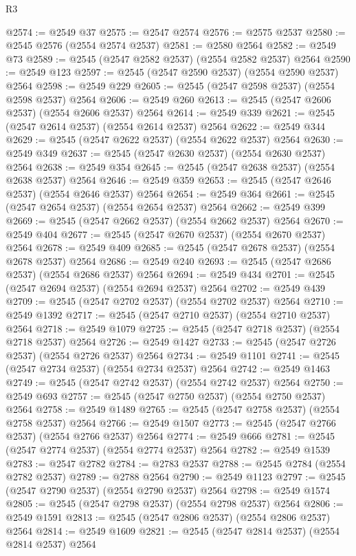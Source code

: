 \begin{lexlean}{R3}
\begin{coremodule}
@2574 := @2549 @37
@2575 := @2547 @2574
@2576 := @2575 @2537
@2580 := @2545 @2576 (@2554 @2574 @2537)
@2581 := @2580 @2564
@2582 := @2549 @73
@2589 := @2545 (@2547 @2582 @2537) (@2554 @2582 @2537) @2564
@2590 := @2549 @123
@2597 := @2545 (@2547 @2590 @2537) (@2554 @2590 @2537) @2564
@2598 := @2549 @229
@2605 := @2545 (@2547 @2598 @2537) (@2554 @2598 @2537) @2564
@2606 := @2549 @260
@2613 := @2545 (@2547 @2606 @2537) (@2554 @2606 @2537) @2564
@2614 := @2549 @339
@2621 := @2545 (@2547 @2614 @2537) (@2554 @2614 @2537) @2564
@2622 := @2549 @344
@2629 := @2545 (@2547 @2622 @2537) (@2554 @2622 @2537) @2564
@2630 := @2549 @349
@2637 := @2545 (@2547 @2630 @2537) (@2554 @2630 @2537) @2564
@2638 := @2549 @354
@2645 := @2545 (@2547 @2638 @2537) (@2554 @2638 @2537) @2564
@2646 := @2549 @359
@2653 := @2545 (@2547 @2646 @2537) (@2554 @2646 @2537) @2564
@2654 := @2549 @364
@2661 := @2545 (@2547 @2654 @2537) (@2554 @2654 @2537) @2564
@2662 := @2549 @399
@2669 := @2545 (@2547 @2662 @2537) (@2554 @2662 @2537) @2564
@2670 := @2549 @404
@2677 := @2545 (@2547 @2670 @2537) (@2554 @2670 @2537) @2564
@2678 := @2549 @409
@2685 := @2545 (@2547 @2678 @2537) (@2554 @2678 @2537) @2564
@2686 := @2549 @240
@2693 := @2545 (@2547 @2686 @2537) (@2554 @2686 @2537) @2564
@2694 := @2549 @434
@2701 := @2545 (@2547 @2694 @2537) (@2554 @2694 @2537) @2564
@2702 := @2549 @439
@2709 := @2545 (@2547 @2702 @2537) (@2554 @2702 @2537) @2564
@2710 := @2549 @1392
@2717 := @2545 (@2547 @2710 @2537) (@2554 @2710 @2537) @2564
@2718 := @2549 @1079
@2725 := @2545 (@2547 @2718 @2537) (@2554 @2718 @2537) @2564
@2726 := @2549 @1427
@2733 := @2545 (@2547 @2726 @2537) (@2554 @2726 @2537) @2564
@2734 := @2549 @1101
@2741 := @2545 (@2547 @2734 @2537) (@2554 @2734 @2537) @2564
@2742 := @2549 @1463
@2749 := @2545 (@2547 @2742 @2537) (@2554 @2742 @2537) @2564
@2750 := @2549 @693
@2757 := @2545 (@2547 @2750 @2537) (@2554 @2750 @2537) @2564
@2758 := @2549 @1489
@2765 := @2545 (@2547 @2758 @2537) (@2554 @2758 @2537) @2564
@2766 := @2549 @1507
@2773 := @2545 (@2547 @2766 @2537) (@2554 @2766 @2537) @2564
@2774 := @2549 @666
@2781 := @2545 (@2547 @2774 @2537) (@2554 @2774 @2537) @2564
@2782 := @2549 @1539
@2783 := @2547 @2782
@2784 := @2783 @2537
@2788 := @2545 @2784 (@2554 @2782 @2537)
@2789 := @2788 @2564
@2790 := @2549 @1123
@2797 := @2545 (@2547 @2790 @2537) (@2554 @2790 @2537) @2564
@2798 := @2549 @1574
@2805 := @2545 (@2547 @2798 @2537) (@2554 @2798 @2537) @2564
@2806 := @2549 @1591
@2813 := @2545 (@2547 @2806 @2537) (@2554 @2806 @2537) @2564
@2814 := @2549 @1609
@2821 := @2545 (@2547 @2814 @2537) (@2554 @2814 @2537) @2564

\end{coremodule}
\end{lexlean}

